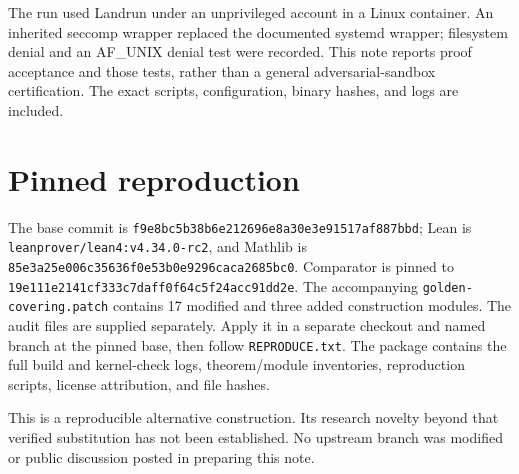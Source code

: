 \documentclass[10pt]{article}
\begin{document}
The run used Landrun under an unprivileged account in a Linux container.
An inherited seccomp wrapper replaced the documented systemd wrapper;
filesystem denial and an AF\_UNIX denial test were recorded. This note reports
proof acceptance and those tests, rather than a general adversarial-sandbox
certification. The exact scripts, configuration, binary hashes, and logs
are included.

\section*{Pinned reproduction}
The base commit is
\texttt{f9e8bc5b38b6e212696e8a30e3e91517af887bbd}; Lean is
\texttt{leanprover/lean4:v4.34.0-rc2}, and Mathlib is
\texttt{85e3a25e006c35636f0e53b0e9296caca2685bc0}.
Comparator is pinned to
\texttt{19e111e2141cf333c7daff0f64c5f24acc91dd2e}.
The accompanying \texttt{golden-covering.patch} contains 17 modified and
three added construction modules. The audit files are supplied separately.
Apply it in a separate checkout and named branch at the pinned base,
then follow \texttt{REPRODUCE.txt}. The package contains the full build and
kernel-check logs, theorem/module inventories, reproduction scripts,
license attribution, and file hashes.

This is a reproducible alternative construction. Its research novelty beyond
that verified substitution has not been established. No upstream branch
was modified or public discussion posted in preparing this note.
\end{document}
